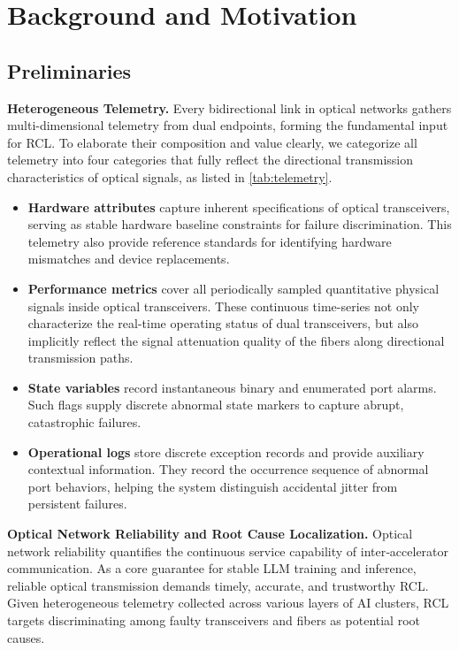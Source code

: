 \section{Background and Motivation}\label{sec:background}

\subsection{Preliminaries}



\noindent \textbf{Heterogeneous Telemetry.} Every bidirectional link in optical networks gathers multi-dimensional telemetry from dual endpoints, forming the fundamental input for RCL. To elaborate their composition and value clearly, we categorize all telemetry into four categories that fully reflect the directional transmission characteristics of optical signals, as listed in \autoref{tab:telemetry}.

\begin{itemize} [itemsep=0pt,leftmargin=*]
    \item \textbf{Hardware attributes} capture inherent specifications of optical transceivers, serving as stable hardware baseline constraints for failure discrimination. This telemetry also provide reference standards for identifying hardware mismatches and device replacements.
    \item \textbf{Performance metrics} cover all periodically sampled quantitative physical signals inside optical transceivers. These continuous time-series not only characterize the real-time operating status of dual transceivers, but also implicitly reflect the signal attenuation quality of the fibers along directional transmission paths.
    \item \textbf{State variables} record instantaneous binary and enumerated port alarms. Such flags supply discrete abnormal state markers to capture abrupt, catastrophic failures.
    \item \textbf{Operational logs} store discrete exception records and provide auxiliary contextual information. They record the occurrence sequence of abnormal port behaviors, helping the system distinguish accidental jitter from persistent failures.
\end{itemize}

\noindent \textbf{Optical Network Reliability and Root Cause Localization.} Optical network reliability quantifies the continuous service capability of inter‑accelerator communication. As a core guarantee for stable LLM training and inference, reliable optical transmission demands timely, accurate, and trustworthy RCL. Given heterogeneous telemetry collected across various layers of AI clusters, RCL targets discriminating among faulty transceivers and fibers as potential root causes.

